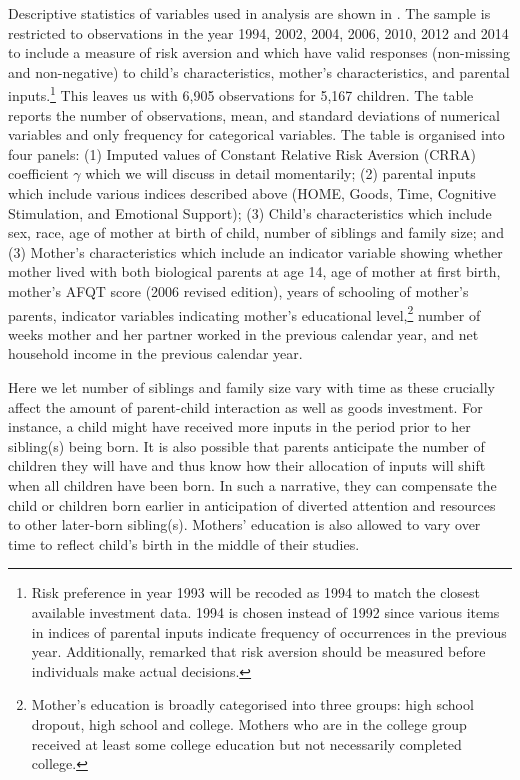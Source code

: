 \documentclass[]{article}
\begin{document}
Descriptive statistics of variables used in analysis are shown in . The sample is restricted to observations in the year 1994, 2002, 2004, 2006, 2010, 2012 and 2014 to include a measure of risk aversion and which have valid responses (non-missing and non-negative) to child's characteristics, mother's characteristics, and parental inputs.\footnote{Risk preference in year 1993 will be recoded as 1994 to match the closest available investment data. 1994 is chosen instead of 1992 since various items in indices of parental inputs indicate frequency of occurrences in the previous year. Additionally, \citet{hartog2002linking} remarked that risk aversion should be measured before individuals make actual decisions.} This leaves us with 6,905 observations for 5,167 children. The table reports the number of observations, mean, and standard deviations of numerical variables and only frequency for categorical variables. The table is organised into four panels: (1) Imputed values of Constant Relative Risk Aversion (CRRA) coefficient $\gamma$ which we will discuss in detail momentarily; (2) parental inputs which include various indices described above (HOME, Goods, Time, Cognitive Stimulation, and Emotional Support); (3) Child's characteristics which include sex, race, age of mother at birth of child, number of siblings and family size; and (3) Mother's characteristics which include an indicator variable showing whether mother lived with both biological parents at age 14, age of mother at first birth, mother's AFQT score (2006 revised edition), years of schooling of mother's parents, indicator variables indicating mother's educational level,\footnote{Mother's education is broadly categorised into three groups: high school dropout, high school and college. Mothers who are in the college group received at least some college education but not necessarily completed college.} number of weeks mother and her partner worked in the previous calendar year, and net household income in the previous calendar year. 

Here we let number of siblings and family size vary with time as these crucially affect the amount of parent-child interaction as well as goods investment. For instance, a child might have received more inputs in the period prior to her sibling(s) being born. It is also possible that parents anticipate the number of children they will have and thus know how their allocation of inputs will shift when all children have been born. In such a narrative, they can compensate the child or children born earlier in anticipation of diverted attention and resources to other later-born sibling(s). Mothers' education is also allowed to vary over time to reflect child's birth in the middle of their studies. 
\end{document}
